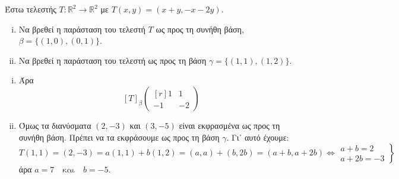 \documentclass[a4paper]{report}
\begin{document}
\begin{example}
  Έστω τελεστής $ T \colon \mathbb{R}^{2} \to \mathbb{R}^{2} $ με 
  $ T(x,y) = (x+y,-x-2y) $. 
  \begin{enumerate}[i)]
    \item Να βρεθεί η παράσταση του τελεστή $ T $ ως προς τη συνήθη βάση, 
      $\beta = \{ (1,0), (0,1) \} $.
    \item Να βρεθεί η παράσταση του τελεστή ως προς τη βάση 
      $ \gamma = \{ (1,1), (1,2) \} $.
  \end{enumerate}
\end{example}
\begin{solution}
\item {}
  \begin{enumerate}[i)]
    \item 
      Άρα 
      \[
        [T]_{\beta} 
        \begin{pmatrix*}[r]
          1 & 1 \\
          -1 & -2
        \end{pmatrix*}
      \] 
    \item 
      Όμως τα διανύσματα $ (2,-3) $ και $ (3,-5) $ είναι εκφρασμένα ως προς τη συνήθη 
      βάση. Πρέπει να τα εκφράσουμε ως προς τη βάση $ \gamma $. Γι᾽ αυτό έχουμε:
      \[
        T(1,1)=(2,-3) = a(1,1)+b(1,2) = (a,a)+(b,2b)=(a+b,a+2b) \Leftrightarrow 
        \left.
          \begin{matrix}
            a+b=2 \\
            a+2b=-3
          \end{matrix} 
        \right\} 
      \] 
      άρα $ a=7 \quad \text{και} \quad b=-5 $.

  \end{enumerate}
\end{solution}
\end{document}
